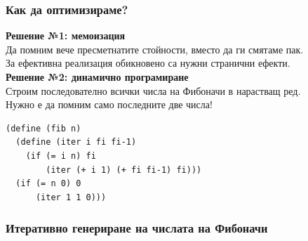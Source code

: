 \documentclass[alsotrans,beameroptions={aspectratio=169}]{beamerswitch}
\begin{document}
\begin{frame}[fragile]
  \frametitle{Как да оптимизираме?}

  \textbf{Решение №1: мемоизация}\\
  Да помним вече пресметнатите стойности, вместо да ги смятаме пак.\\
  \pause
  \alert{За ефективна реализация обикновено са нужни странични ефекти.}\\[2ex]
  \pause
  \textbf{Решение №2: динамично програмиране}\\
  Строим последователно всички числа на Фибоначи в нарастващ ред.\\
  \pause
  \alert{Нужно е да помним само последните две числа!}\\
  \pause
\begin{lstlisting}
(define (fib n)
  (define (iter i fi fi-1)
    (if (= i n) fi
        (iter (+ i 1) (+ fi fi-1) fi)))
  (if (= n 0) 0
      (iter 1 1 0)))
\end{lstlisting}
\end{frame}

\begin{frame}
  \frametitle{Итеративно генериране на числата на Фибоначи}

  \footnotesize
  \begin{center}
  \end{center}
\end{frame}
\end{document}
